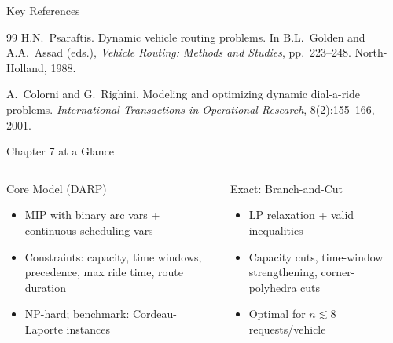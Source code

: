 \documentclass[aspectratio=169,10pt]{beamer}
\begin{document}
\begin{frame}[allowframebreaks]{Key References}
\begin{thebibliography}{99}
      H.N.\ Psaraftis.
      \newblock Dynamic vehicle routing problems.
      \newblock In B.L.\ Golden and A.A.\ Assad (eds.),
        \emph{Vehicle Routing: Methods and Studies}, pp.\ 223--248.
        North-Holland, 1988.

      A.\ Colorni and G.\ Righini.
      \newblock Modeling and optimizing dynamic dial-a-ride problems.
      \newblock \emph{International Transactions in Operational Research},
        8(2):155--166, 2001.

  \end{thebibliography}

\end{frame}

\begin{frame}[allowframebreaks]{Chapter 7 at a Glance}
  \begin{columns}[t]
      \begin{block}{Core Model (DARP)}
        \begin{itemize}\small
          \item MIP with binary arc vars + continuous scheduling vars
          \item Constraints: capacity, time windows, precedence,
                max ride time, route duration
          \item NP-hard; benchmark: Cordeau-Laporte instances
        \end{itemize}
      \end{block}
      \vspace{4pt}
      \begin{block}{Exact: Branch-and-Cut}
        \begin{itemize}\small
          \item LP relaxation + valid inequalities
          \item Capacity cuts, time-window strengthening,
                corner-polyhedra cuts
          \item Optimal for $n \lesssim 8$ requests/vehicle
        \end{itemize}
      \end{block}


\end{columns}
\end{frame}
\end{document}
